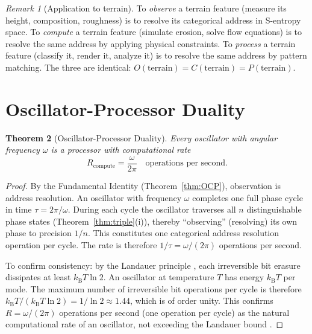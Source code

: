 \documentclass[10pt,twocolumn]{article}
\newtheorem{theorem}{Theorem}[section]
\theoremstyle{definition}
\theoremstyle{remark}
\newtheorem{remark}[theorem]{Remark}
\newcommand{\kB}{k_{\mathrm{B}}}
\begin{document}
\begin{remark}[Application to terrain]
To \emph{observe} a terrain feature (measure its height,
composition, roughness) is to resolve its categorical address
in S-entropy space.  To \emph{compute} a terrain feature
(simulate erosion, solve flow equations) is to resolve the same
address by applying physical constraints.  To \emph{process} a
terrain feature (classify it, render it, analyze it) is to
resolve the same address by pattern matching.  The three are
identical: $O(\text{terrain})=C(\text{terrain})=P(\text{terrain})$.
\end{remark}

\section{Oscillator-Processor Duality}\label{sec:duality}

\begin{theorem}[Oscillator-Processor Duality]
\label{thm:osc-proc}
Every oscillator with angular frequency $\omega$ is a processor
with computational rate
\begin{equation}\label{eq:duality}
  R_{\mathrm{compute}} = \frac{\omega}{2\pi}
  \quad\text{operations per second}.
\end{equation}
\end{theorem}

\begin{proof}
By the Fundamental Identity (Theorem~\ref{thm:OCP}),
observation is address resolution.  An oscillator with
frequency $\omega$ completes one full phase cycle in time
$\tau=2\pi/\omega$.  During each cycle the oscillator traverses
all $n$ distinguishable phase states
(Theorem~\ref{thm:triple}(i)), thereby ``observing'' (resolving)
its own phase to precision $1/n$.  This constitutes one
categorical address resolution operation per cycle.  The
rate is therefore $1/\tau = \omega/(2\pi)$ operations per
second.

To confirm consistency: by the Landauer principle
\citep{Landauer1961}, each irreversible bit erasure dissipates
at least $\kB T\ln 2$.  An oscillator at temperature $T$ has
energy $\kB T$ per mode.  The maximum number of irreversible
bit operations per cycle is therefore $\kB T/(\kB T\ln 2) =
1/\ln 2 \approx 1.44$, which is of order unity.  This confirms
$R=\omega/(2\pi)$ operations per second (one operation per
cycle) as the natural computational rate of an oscillator, not
exceeding the Landauer bound \citep{Bennett1982}.
\end{proof}
\end{document}
